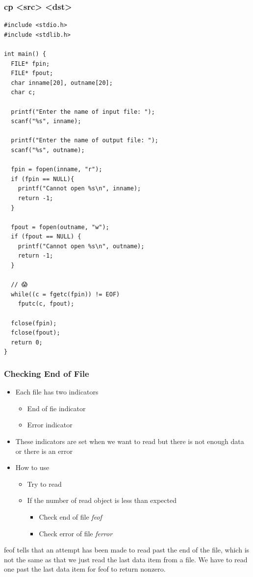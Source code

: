 \documentclass{../c-lecture}
\begin{document}
\begin{frame}[fragile]
  \frametitle{cp <src> <dst>}
  \begin{verbatim}
#include <stdio.h>
#include <stdlib.h>

int main() {
  FILE* fpin;
  FILE* fpout;
  char inname[20], outname[20];
  char c;

  printf("Enter the name of input file: ");
  scanf("%s", inname);

  printf("Enter the name of output file: ");
  scanf("%s", outname);

  fpin = fopen(inname, "r");
  if (fpin == NULL){
    printf("Cannot open %s\n", inname);
    return -1;
  }

  fpout = fopen(outname, "w");
  if (fpout == NULL) {
    printf("Cannot open %s\n", outname);
    return -1;
  }

  // 😱
  while((c = fgetc(fpin)) != EOF)
    fputc(c, fpout);

  fclose(fpin);
  fclose(fpout);
  return 0;
}
  \end{verbatim}
\end{frame}

\begin{frame}
  \frametitle{Checking End of File}
  \begin{itemize}
    \item Each file has two indicators
    \begin{itemize}
      \item End of fie indicator
      \item Error indicator
    \end{itemize}
    \item
      These indicators are set when we want to read but there is not enough
      data or there is an error
    \item How to use
    \begin{itemize}
      \item Try to read
      \item If the number of read object is less than expected
      \begin{itemize}
        \item Check end of file \textrightarrow \textit{\color{YellowOrange} feof}
        \item Check error of file \textrightarrow \textit{\color{LimeGreen} ferror}
      \end{itemize}
    \end{itemize}
  \end{itemize}
\end{frame}
\begin{frame}
  \begin{block}
    feof tells that an attempt has been made to read past the end of the file,
    which is not the same as that we just read the last data item from a file.
    We have to read one past the last data item for feof to return nonzero.
  \end{block}
\end{frame}
\end{document}
